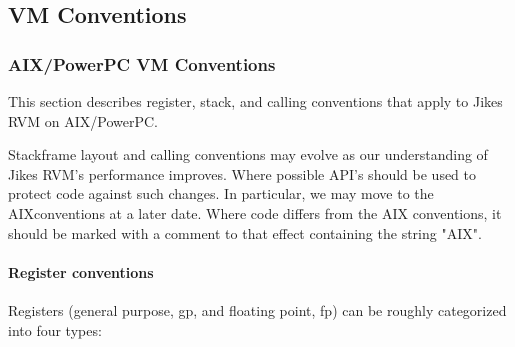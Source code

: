\subsection{VM Conventions}

\subsubsection{AIX/PowerPC VM Conventions}
\label{aix-conventions}


This section describes register, stack, and calling conventions that apply to 
Jikes RVM on AIX/PowerPC\TMweb.

Stackframe layout and calling conventions may evolve as our understanding
of Jikes RVM's performance improves.  Where possible API's should be used
to protect code against such changes.  In particular, we may move to
the AIX\TMweb conventions at a later date.  Where code differs from the AIX
conventions, it should be marked with a comment to that effect containing
the string "AIX".

\paragraph{Register conventions}

Registers (general purpose, gp, and floating point, fp) can be roughly
categorized into four types:

